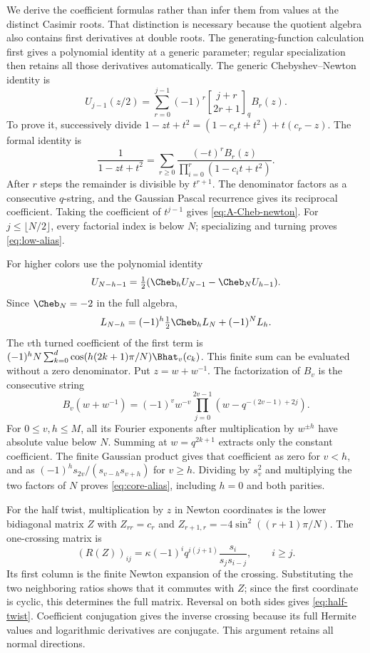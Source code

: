 We derive the coefficient formulas rather than infer them from values at the distinct Casimir roots. That distinction is necessary because the quotient algebra also contains first derivatives at double roots. The generating-function calculation first gives a polynomial identity at a generic parameter; regular specialization then retains all those derivatives automatically.
The generic Chebyshev--Newton identity is
\begin{equation}\label{eq:A-Cheb-newton}
 U_{j-1}(z/2)=\sum_{r=0}^{j-1}(-1)^r
 \genfrac{[}{]}{0pt}{}{j+r}{2r+1}_q B_r(z).
\end{equation}
To prove it, successively divide
$1-zt+t^2=(1-c_rt+t^2)+t(c_r-z)$. The formal identity is
\[
 \frac1{1-zt+t^2}
 =\sum_{r\ge0}\frac{(-t)^rB_r(z)}{\prod_{i=0}^{r}(1-c_it+t^2)}.
\]
After $r$ steps the remainder is divisible by $t^{r+1}$. The denominator factors as a consecutive $q$-string, and the Gaussian Pascal recurrence gives its reciprocal coefficient. Taking the coefficient of $t^{j-1}$ gives \eqref{eq:A-Cheb-newton}. For $j\le\lfloor N/2\rfloor$, every factorial index is below $N$; specializing and turning proves \eqref{eq:low-alias}.

For higher colors use the polynomial identity
\[
 U_{N-h-1}=\tfrac12(\Cheb_hU_{N-1}-\Cheb_NU_{h-1}).
\]
Since $\Cheb_N=-2$ in the full algebra,
\[
 L_{N-h}=(-1)^h\tfrac12\Cheb_hL_N+(-1)^NL_h.
\]
The $v$th turned coefficient of the first term is
$(-1)^hN\sum_{k=0}^{d}\cos(h(2k+1)\pi/N)\Bhat_v(c_k)$.
This finite sum can be evaluated without a zero denominator. Put $z=w+w^{-1}$. The factorization of $B_v$ is the consecutive string
\[
 B_v(w+w^{-1})=(-1)^vw^{-v}
 \prod_{j=0}^{2v-1}\left(w-q^{-(2v-1)+2j}\right).
\]
For $0\le v,h\le M$, all its Fourier exponents after multiplication by $w^{\pm h}$ have absolute value below $N$. Summing at $w=q^{2k+1}$ extracts only the constant coefficient. The finite Gaussian product gives that coefficient as zero for $v<h$, and as
$(-1)^h s_{2v}/(s_{v-h}s_{v+h})$ for $v\ge h$. Dividing by $s_v^2$ and multiplying the two factors of $N$ proves \eqref{eq:core-alias}, including $h=0$ and both parities.

For the half twist, multiplication by $z$ in Newton coordinates is the lower bidiagonal matrix $Z$ with $Z_{rr}=c_r$ and $Z_{r+1,r}=-4\sin^2((r+1)\pi/N)$. The one-crossing matrix is
\[
 (R(Z))_{ij}=\kappa(-1)^iq^{i(j+1)}\frac{s_i}{s_js_{i-j}},\qquad i\ge j.
\]
Its first column is the finite Newton expansion of the crossing. Substituting the two neighboring ratios shows that it commutes with $Z$; since the first coordinate is cyclic, this determines the full matrix. Reversal on both sides gives \eqref{eq:half-twist}. Coefficient conjugation gives the inverse crossing because its full Hermite values and logarithmic derivatives are conjugate. This argument retains all normal directions.

